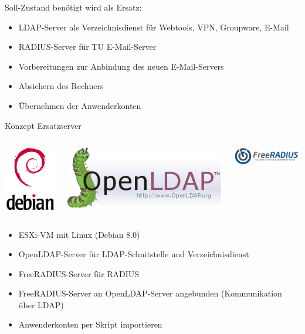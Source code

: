 \documentclass[handout,svgnames]{beamer}
\begin{document}
\begin{frame}{Soll-Zustand}
benötigt wird als Ersatz:
\begin{itemize}
	\item LDAP-Server als Verzeichnisdienst für Webtools, VPN, Groupware, E-Mail
	\item RADIUS-Server für TU E-Mail-Server
	\item Vorbereitungen zur Anbindung des neuen E-Mail-Servers
	\item Absichern des Rechners
	\item Übernehmen der Anwenderkonten
\end{itemize}
\end{frame}


\begin{frame}{Konzept Ersatzserver}
\begin{columns}[c]
	\begin{column}{0.5cm}
		\includegraphics[scale=0.3]{Bilder/debian-openlogo-100.png}
	\end{column}
	\begin{column}{1.5cm}
		\includegraphics[scale=0.25]{Bilder/OpenLDAP-logo.png}
	\end{column}
	\begin{column}{2.5cm}
		\includegraphics[width=3.5cm]{Bilder/Freeradius_logo.png} 
	\end{column}
\end{columns}
\begin{itemize}
	\item ESXi-VM mit Linux (Debian 8.0)
	\item OpenLDAP-Server für LDAP-Schnitstelle und Verzeichnisdienst
	\item FreeRADIUS-Server für RADIUS
	\item FreeRADIUS-Server an OpenLDAP-Server angebunden (Kommunikation über LDAP)
	\item Anwenderkonten per Skript importieren
\end{itemize}
\end{frame}
\end{document}
